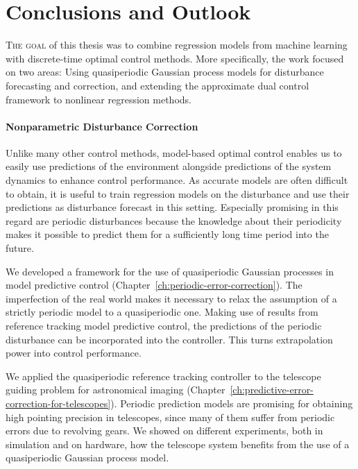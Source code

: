 \chapter{Conclusions and Outlook}
\label{ch:conclusions}

\lettrine{T}{he goal} of this thesis was to combine regression models from
machine learning with discrete-time optimal control methods. More specifically,
the work focused on two areas: Using quasiperiodic Gaussian process models for
disturbance forecasting and correction, and extending the approximate dual
control framework to nonlinear regression methods.

\subsubsection{Nonparametric Disturbance Correction}

Unlike many other control methods, model-based optimal control enables us to
easily use predictions of the environment alongside predictions of the system
dynamics to enhance control performance. As accurate models are often difficult
to obtain, it is useful to train regression models on the disturbance and
use their predictions as disturbance forecast in this setting. Especially
promising in this regard are periodic disturbances because the knowledge about
their periodicity makes it possible to predict them for a sufficiently long
time period into the future.

We developed a framework for the use of quasiperiodic Gaussian processes in
model predictive control (Chapter~\ref{ch:periodic-error-correction}). The
imperfection of the real world makes it necessary to relax the assumption of a
strictly periodic model to a quasiperiodic one. Making use of results from
reference tracking model predictive control, the predictions of the periodic
disturbance can be incorporated into the controller. This turns extrapolation
power into control performance.

We applied the quasiperiodic reference tracking controller to the telescope
guiding problem for astronomical imaging
(Chapter~\ref{ch:predictive-error-correction-for-telescopes}).
Periodic prediction models are promising for obtaining high pointing
precision in telescopes, since many of them suffer from periodic errors due to
revolving gears. We showed on different experiments, both in simulation and on
hardware, how the telescope system benefits from the use of a quasiperiodic
Gaussian process model.

